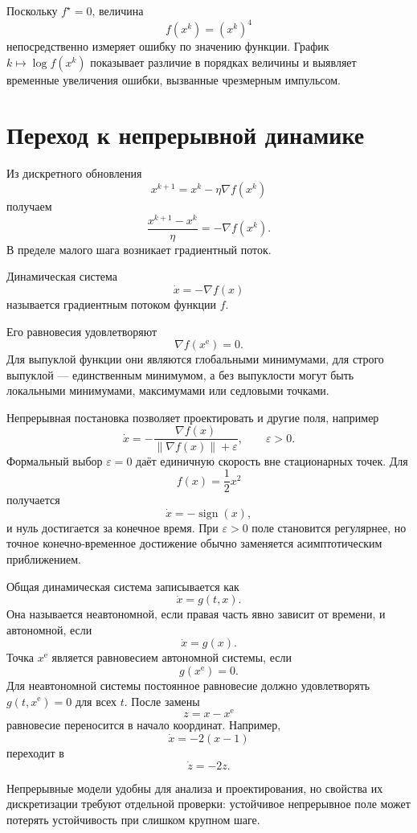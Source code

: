 Поскольку \(f^\star=0\), величина
\[
    f(x^k)=(x^k)^4
\]
непосредственно измеряет ошибку по значению функции. График
\(k\mapsto\log f(x^k)\) показывает различие в порядках величины и
выявляет временные увеличения ошибки, вызванные чрезмерным импульсом.

\section{Переход к непрерывной динамике}

Из дискретного обновления
\[
    x^{k+1}=x^k-\eta\nabla f(x^k)
\]
получаем
\[
    \frac{x^{k+1}-x^k}{\eta}
    =
    -\nabla f(x^k).
\]
В пределе малого шага возникает градиентный поток.

\begin{definition}
Динамическая система
\[
    \dot x=-\nabla f(x)
\]
называется градиентным потоком функции \(f\).
\end{definition}

Его равновесия удовлетворяют
\[
    \nabla f(x^{\mathrm e})=0.
\]
Для выпуклой функции они являются глобальными минимумами, для строго
выпуклой --- единственным минимумом, а без выпуклости могут быть
локальными минимумами, максимумами или седловыми точками.

Непрерывная постановка позволяет проектировать и другие поля,
например
\[
    \dot x
    =
    -\frac{\nabla f(x)}
    {\lVert\nabla f(x)\rVert+\varepsilon},
    \qquad
    \varepsilon>0.
\]
Формальный выбор \(\varepsilon=0\) даёт единичную скорость вне
стационарных точек. Для
\[
    f(x)=\frac12x^2
\]
получается
\[
    \dot x=-\operatorname{sign}(x),
\]
и нуль достигается за конечное время. При \(\varepsilon>0\) поле
становится регулярнее, но точное конечно-временное достижение обычно
заменяется асимптотическим приближением.

Общая динамическая система записывается как
\[
    \dot x=g(t,x).
\]
Она называется неавтономной, если правая часть явно зависит от
времени, и автономной, если
\[
    \dot x=g(x).
\]
Точка \(x^{\mathrm e}\) является равновесием автономной системы, если
\[
    g(x^{\mathrm e})=0.
\]
Для неавтономной системы постоянное равновесие должно удовлетворять
\(g(t,x^{\mathrm e})=0\) для всех \(t\). После замены
\[
    z=x-x^{\mathrm e}
\]
равновесие переносится в начало координат. Например,
\[
    \dot x=-2(x-1)
\]
переходит в
\[
    \dot z=-2z.
\]

Непрерывные модели удобны для анализа и проектирования, но свойства
их дискретизации требуют отдельной проверки: устойчивое непрерывное
поле может потерять устойчивость при слишком крупном шаге.

